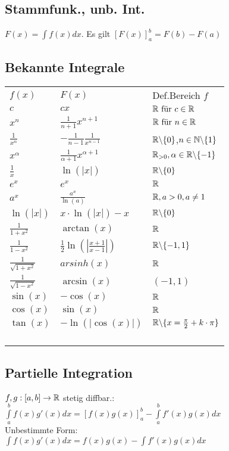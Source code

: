 \subsection*{Stammfunk., unb. Int.}
$F(x) = \int f(x) dx$. Es gilt $[F(x)]_a^b = F(b) - F(a)$
\subsection*{Bekannte Integrale}
\begin{tabular}{p{2em}p{4.6em}p{10em}}
     $f(x)$ & $F(x)$ & Def.Bereich $f$ \\
     $c$ & $cx$ & $\mathbb R \text{ für } c\in \mathbb R$ \\
     $x^n$ & $\frac{1}{n+1} x^{n +1}$ & $\mathbb R \text{ für } n \in \mathbb R$ \\
     $\frac{1}{x^n}$ & $- \frac{1}{n-1} \frac{1}{x^{n-1}}$ & $\mathbb R \backslash \{0\}$,$n \in \mathbb N\backslash\{1\}$ \\
     $x^\alpha$ & $\frac{1}{\alpha + 1} x^{\alpha + 1}$ & $\mathbb R_{>0}, \alpha \in \mathbb R\backslash\{-1\}$ \\
     $\frac{1}{x}$ & $\ln(|x|)$ & $\mathbb R\backslash\{0\}$ \\
     $e^x$ & $e^x$ & $\mathbb R$ \\
     $a^x$ & $\frac{a^x}{\ln(a)}$ & $\mathbb R, a > 0, a \neq 1$ \\
     $\ln(|x|)$ & $x \cdot \ln(|x|) - x$ & $\mathbb R\backslash\{0\}$ \\
     $\frac{1}{1 + x^2}$ & $\arctan(x)$ & $\mathbb R$ \\
     $\frac{1}{1 - x^2}$ & $\frac{1}{2}\ln(|\frac{x + 1}{x - 1}|)$ & $\mathbb R\backslash\{-1, 1\}$ \\
     $\frac{1}{\sqrt{1 + x^2}}$ & $arsinh(x)$ & $\mathbb R$ \\
     $\frac{1}{\sqrt{1 - x^2}}$ & $\arcsin(x)$ & $(-1, 1)$ \\
     $\sin(x)$ & $-\cos(x)$ & $\mathbb R$ \\
     $\cos(x)$ & $\sin(x)$ & $\mathbb R$ \\
     $\tan(x)$ & $- \ln (|\cos(x)|)$ & $\mathbb R\backslash\{x = \frac{\pi}{2} + k \cdot \pi\}$ \\
     $ $ & $ $ & $ $ \\
     $ $ & $ $ & $ $ \\
     $ $ & $ $ & $ $ \\
     $ $ & $ $ & $ $ \\
\end{tabular}
\subsection*{Partielle Integration}
$f, g:[a, b]\rightarrow \mathbb R$ stetig diffbar.:\\
$\int\limits_a^b f(x) g'(x) dx = [f(x) g(x)]_a^b - \int\limits_a ^b f'(x) g(x) dx$\\
Unbestimmte Form: \\
$\int f(x) g'(x) dx = f(x) g(x) - \int f'(x) g(x) dx$

